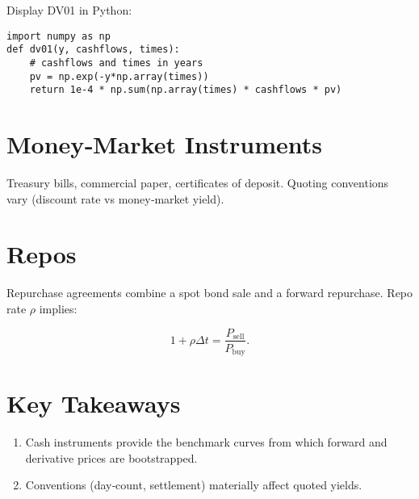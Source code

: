 Display DV01 in Python:

\begin{verbatim}
import numpy as np
def dv01(y, cashflows, times):
    # cashflows and times in years
    pv = np.exp(-y*np.array(times))
    return 1e-4 * np.sum(np.array(times) * cashflows * pv)
\end{verbatim}

\section{Money‑Market Instruments}

Treasury bills, commercial paper, certificates of deposit.  
Quoting conventions vary (discount rate vs money‑market yield).

\section{Repos}

Repurchase agreements combine a spot bond sale and a forward repurchase.
Repo rate \(\rho\) implies:

\[
1 + \rho \Delta t = \frac{P_{\text{sell}}}{P_{\text{buy}}}.
\]

\section*{Key Takeaways}
\begin{enumerate}
  \item Cash instruments provide the benchmark curves from which forward
        and derivative prices are bootstrapped.
  \item Conventions (day‑count, settlement) materially affect quoted yields.
\end{enumerate}
